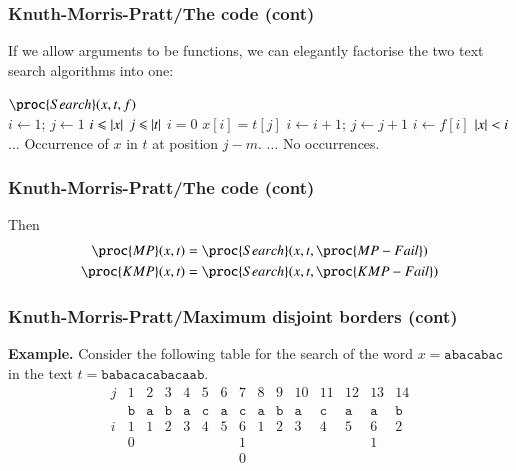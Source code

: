 %
\begin{frame}
\frametitle{Knuth-Morris-Pratt/The code (cont)}

If we allow arguments to be functions, we can elegantly factorise the
two text search algorithms into one:
\begin{codebox}
\(\proc{Search} (x,t,f)\)\\
\li \(i \gets 1\); \(j \gets 1\)
\li \While \(i \leqslant \lvert{x}\lvert{}\) \LogAnd \(j \leqslant \lvert{t}\lvert{}\)
\li \Do \If \(i = 0\) \LogOr \(x[i] = t[j]\)
\li	\Then \(i \gets i + 1\); \(j \gets j + 1\)
\li	\Else \(i \gets f[i]\)
        \End
    \End
\li \If \(\lvert{x}\lvert{} < i\)
\li \Then \(\ldots\) \RComment Occurrence of \(x\) in \(t\) at position \(j - m\).
\li \Else \(\ldots\) \RComment No occurrences.
    \End
\end{codebox}

\end{frame}

%
\begin{frame}
\frametitle{Knuth-Morris-Pratt/The code (cont)}

Then
\begin{align*}
   \proc{MP} (x, t)
&= \proc{Search} (x, t, \proc{MP-Fail})\\
   \proc{KMP} (x, t)
&= \proc{Search} (x, t, \proc{KMP-Fail})
\end{align*}

\end{frame}

%
\begin{frame}
\frametitle{Knuth-Morris-Pratt/Maximum disjoint borders (cont)}

\textbf{Example.} Consider the following table for the search of the
word \(x=\texttt{abacabac}\) in the text
\(t=\texttt{babacacabacaab}\).
\[
\begin{array}{c|cccccccccccccc|}
j & 1 & 2 & 3 & 4 & 5 & 6 & 7 & 8 & 9 & 10 & 11 & 12 & 13 & 14\\
  & \texttt{b} & \texttt{a} & \texttt{b} & \texttt{a} & \texttt{c}
  & \texttt{a} & \texttt{c} & \texttt{a} & \texttt{b} & \texttt{a}
  & \texttt{c} & \texttt{a} & \texttt{a} & \texttt{b}\\
\hline
i & 1 & 1 & 2 & 3 & 4 & 5 & 6 & 1 & 2 & 3 & 4 & 5 & 6 & 2 \\
  & 0 &   &   &   &   &   & 1 &   &   &   &   &   & 1 &   \\
  &   &   &   &   &   &   & 0 &   &   &   &   &   &   &
\end{array}
\]

\end{frame}

